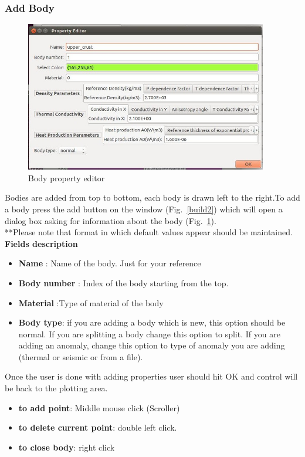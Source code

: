 \documentclass[14pt]{article}
\begin{document}
\subsubsection{Add Body}
\begin{figure}
\centering \includegraphics[width=25pc]{./build_property.jpg}
\caption{Body property editor}
\label{body_property}
\end{figure}
Bodies are added from top to bottom, each body is drawn left to the right.To add a body press the add button on the window (Fig.~\ref{build2}) which will open a dialog box asking for information about the body (Fig.~\ref{body_property}).\\ 
**Please note that format in which default values appear should be maintained.\\
\textbf{Fields description}
\begin{itemize}
\item \textbf{Name}     : Name of the body. Just for your reference
\item \textbf{Body number} : Index of the body starting from the top.
\item \textbf{Material} :Type of material of the body
\item \textbf{Body type}: if you are adding a body which is new, this option should be normal. If you are splitting a body change this option to split. If you are adding an anomaly, change this option to type of anomaly you are adding (thermal or seismic or from a file).
\end{itemize}
Once the user is done with adding properties user should hit OK and control will be back to the plotting area.
\begin{itemize}
\item \textbf{to add point}: Middle mouse click (Scroller)
\item \textbf{to delete current point}: double left click.
\item \textbf{to close body}: right click
\end{itemize} 
\end{document}
